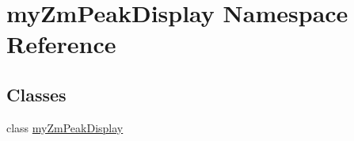 \hypertarget{namespacemy_zm_peak_display}{\section{my\-Zm\-Peak\-Display Namespace Reference}
\label{namespacemy_zm_peak_display}
}
\subsection*{Classes}
\begin{DoxyCompactItemize}
\item 
class \hyperlink{classmy_zm_peak_display_1_1my_zm_peak_display}{my\-Zm\-Peak\-Display}
\end{DoxyCompactItemize}

